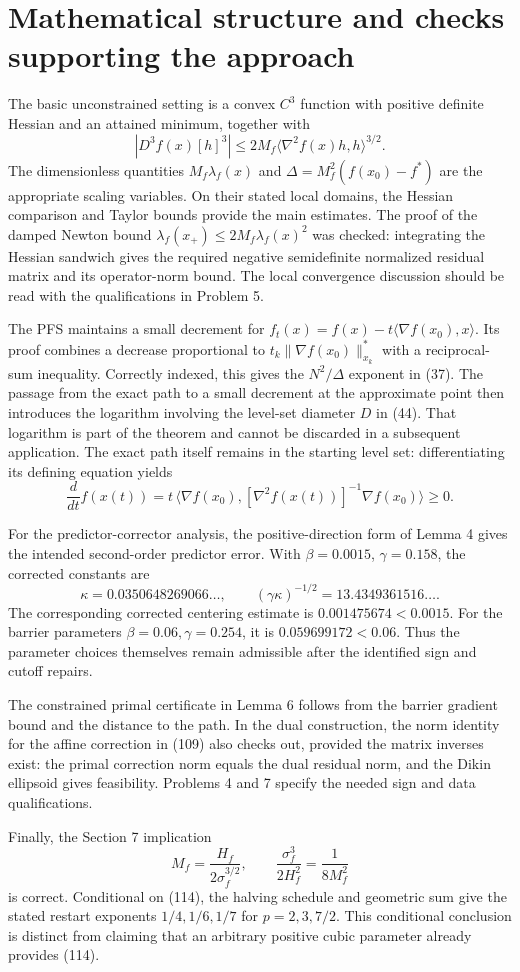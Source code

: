 \documentclass[10pt]{article}
\begin{document}
\section*{Mathematical structure and checks supporting the approach}
The basic unconstrained setting is a convex \(C^3\) function with positive definite Hessian and an attained minimum, together with \[|D^3f(x)[h]^3|\leq 2M_f\langle \nabla^2f(x)h,h\rangle^{3/2}.\] The dimensionless quantities \(M_f\lambda_f(x)\) and \(\Delta=M_f^2(f(x_0)-f^\ast)\) are the appropriate scaling variables. On their stated local domains, the Hessian comparison and Taylor bounds provide the main estimates. The proof of the damped Newton bound \(\lambda_f(x_+)\leq 2M_f\lambda_f(x)^2\) was checked: integrating the Hessian sandwich gives the required negative semidefinite normalized residual matrix and its operator-norm bound. The local convergence discussion should be read with the qualifications in Problem 5.\par
The PFS maintains a small decrement for \(f_t(x)=f(x)-t\langle\nabla f(x_0),x\rangle\). Its proof combines a decrease proportional to \(t_k\|\nabla f(x_0)\|_{x_k}^{\ast}\) with a reciprocal-sum inequality. Correctly indexed, this gives the \(N^2/\Delta\) exponent in (37). The passage from the exact path to a small decrement at the approximate point then introduces the logarithm involving the level-set diameter \(D\) in (44). That logarithm is part of the theorem and cannot be discarded in a subsequent application. The exact path itself remains in the starting level set: differentiating its defining equation yields \[\frac{d}{dt} f(x(t))
 =t\,\langle\nabla f(x_0),[\nabla^2f(x(t))]^{-1}\nabla f(x_0)\rangle\geq0.\]\par
For the predictor-corrector analysis, the positive-direction form of Lemma 4 gives the intended second-order predictor error. With \(\beta=0.0015\), \(\gamma=0.158\), the corrected constants are \[\kappa=0.0350648269066\ldots,\qquad
 (\gamma\kappa)^{-1/2}=13.4349361516\ldots .\] The corresponding corrected centering estimate is \(0.001475674<0.0015\). For the barrier parameters \(\beta=0.06,\gamma=0.254\), it is \(0.059699172<0.06\). Thus the parameter choices themselves remain admissible after the identified sign and cutoff repairs.\par
The constrained primal certificate in Lemma 6 follows from the barrier gradient bound and the distance to the path. In the dual construction, the norm identity for the affine correction in (109) also checks out, provided the matrix inverses exist: the primal correction norm equals the dual residual norm, and the Dikin ellipsoid gives feasibility. Problems 4 and 7 specify the needed sign and data qualifications.\par
Finally, the Section 7 implication \[M_f=\frac{H_f}{2\sigma_f^{3/2}},\qquad
 \frac{\sigma_f^3}{2H_f^2}=\frac{1}{8M_f^2}\] is correct. Conditional on (114), the halving schedule and geometric sum give the stated restart exponents \(1/4,1/6,1/7\) for \(p=2,3,7/2\). This conditional conclusion is distinct from claiming that an arbitrary positive cubic parameter already provides (114).\par
\end{document}
